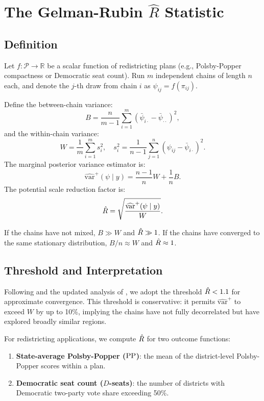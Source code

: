 \section{The Gelman-Rubin $\hat{R}$ Statistic}
\label{sec:rhat}

\subsection{Definition}

Let $f : \mathcal{P} \to \mathbb{R}$ be a scalar function of
redistricting plans (e.g., Polsby-Popper compactness or Democratic
seat count).
Run $m$ independent \recom{} chains of length $n$ each, and denote
the $j$-th draw from chain $i$ as $\psi_{ij} = f(\pi_{ij})$.

Define the between-chain variance:
\[
  B = \frac{n}{m-1} \sum_{i=1}^m \left(\bar{\psi}_{i\cdot} - \bar{\psi}_{\cdot\cdot}\right)^2,
\]
and the within-chain variance:
\[
  W = \frac{1}{m} \sum_{i=1}^m s_i^2, \quad
  s_i^2 = \frac{1}{n-1}\sum_{j=1}^n \left(\psi_{ij} - \bar{\psi}_{i\cdot}\right)^2.
\]
The marginal posterior variance estimator is:
\[
  \widehat{\mathrm{var}}^+(\psi \mid y) = \frac{n-1}{n} W + \frac{1}{n} B.
\]
The potential scale reduction factor is:
\[
  \hat{R} = \sqrt{\frac{\widehat{\mathrm{var}}^+(\psi \mid y)}{W}}.
\]

If the chains have not mixed, $B \gg W$ and $\hat{R} \gg 1$.
If the chains have converged to the same stationary distribution,
$B / n \approx W$ and $\hat{R} \approx 1$.

\subsection{Threshold and Interpretation}

Following \citet{gelman1992} and the updated analysis of \citet{vehtari2021},
we adopt the threshold $\hat{R} < 1.1$ for approximate convergence.
This threshold is conservative: it permits $\widehat{\mathrm{var}}^+$ to
exceed $W$ by up to 10\%, implying the chains have not fully decorrelated
but have explored broadly similar regions.

For redistricting applications, we compute $\hat{R}$ for two outcome
functions:
\begin{enumerate}
\item \textbf{State-average Polsby-Popper ($\mathrm{PP}$)}: the mean of the
      district-level Polsby-Popper scores within a plan.
\item \textbf{Democratic seat count ($D$-seats)}: the number of districts
      with Democratic two-party vote share exceeding 50\%.
\end{enumerate}

